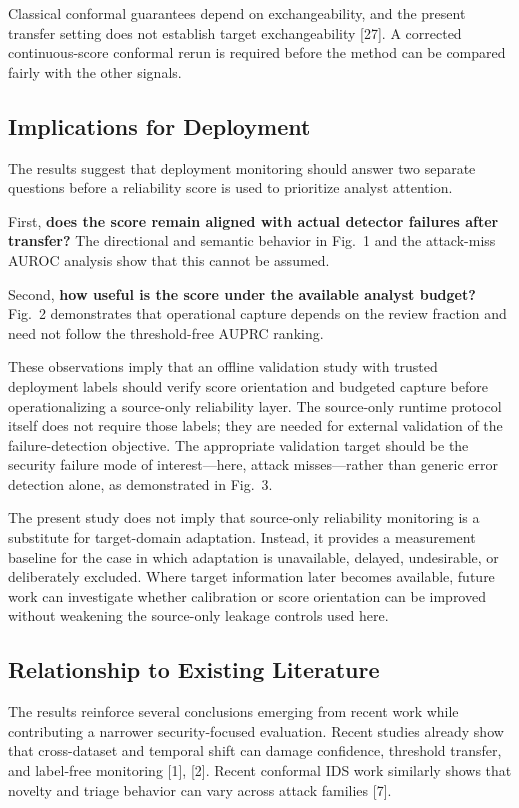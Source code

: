 \documentclass[conference]{IEEEtran}
\begin{document}
Classical conformal guarantees depend on exchangeability, and the present transfer setting does not establish target exchangeability [27]. A corrected continuous-score conformal rerun is required before the method can be compared fairly with the other signals.

\subsection{Implications for Deployment}

The results suggest that deployment monitoring should answer two separate questions before a reliability score is used to prioritize analyst attention.

First, \textbf{does the score remain aligned with actual detector failures after transfer?} The directional and semantic behavior in Fig.~1 and the attack-miss AUROC analysis show that this cannot be assumed.

Second, \textbf{how useful is the score under the available analyst budget?} Fig.~2 demonstrates that operational capture depends on the review fraction and need not follow the threshold-free AUPRC ranking.

These observations imply that an offline validation study with trusted deployment labels should verify score orientation and budgeted capture before operationalizing a source-only reliability layer. The source-only runtime protocol itself does not require those labels; they are needed for external validation of the failure-detection objective. The appropriate validation target should be the security failure mode of interest—here, attack misses—rather than generic error detection alone, as demonstrated in Fig.~3.

The present study does not imply that source-only reliability monitoring is a substitute for target-domain adaptation. Instead, it provides a measurement baseline for the case in which adaptation is unavailable, delayed, undesirable, or deliberately excluded. Where target information later becomes available, future work can investigate whether calibration or score orientation can be improved without weakening the source-only leakage controls used here.

\subsection{Relationship to Existing Literature}

The results reinforce several conclusions emerging from recent work while contributing a narrower security-focused evaluation. Recent studies already show that cross-dataset and temporal shift can damage confidence, threshold transfer, and label-free monitoring [1], [2]. Recent conformal IDS work similarly shows that novelty and triage behavior can vary across attack families [7].
\end{document}
